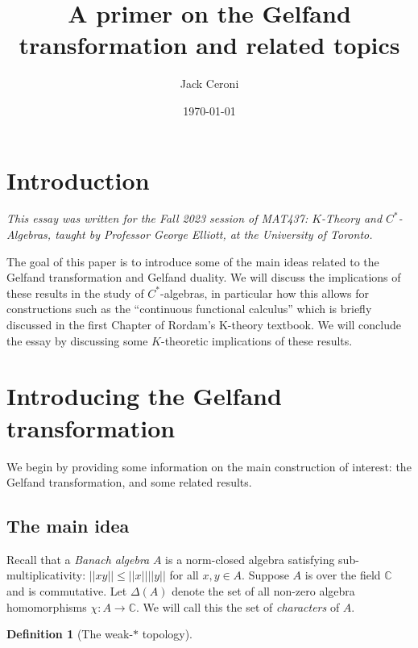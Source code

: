 \documentclass[aps,pra,showpacs,notitlepage,onecolumn,superscriptaddress,nofootinbib]{revtex4-1}
\theoremstyle{definition}
\newtheorem{definition}{Definition}[section]
\begin{document}
\title{A primer on the Gelfand transformation and related topics}
\author{Jack Ceroni}

\date{\today}

\maketitle

\section{Introduction}

\noindent \emph{This essay was written for the Fall 2023 session of MAT437: $K$-Theory and $C^{*}$-Algebras, taught by Professor George Elliott, at the University of Toronto.}
\newline

\noindent The goal of this paper is to introduce some of the main ideas related to the Gelfand transformation and Gelfand duality.
We will discuss the implications of these results in the study of $C^{*}$-algebras, in particular how this allows for constructions
such as the ``continuous functional calculus'' which is briefly discussed in the first Chapter of Rordam's K-theory textbook. We will conclude the essay by
discussing some $K$-theoretic implications of these results.

\section{Introducing the Gelfand transformation}

\noindent We begin by providing some information on the main construction of interest: the Gelfand transformation, and some related results.

\subsection{The main idea}

\noindent Recall that a \emph{Banach algebra} $A$ is a norm-closed algebra satisfying sub-multiplicativity: $||xy|| \leq ||x|| ||y||$ for all $x, y \in A$. Suppose $A$ is over the field $\mathbb{C}$
and is commutative. Let $\Delta(A)$ denote the set of all non-zero algebra homomorphisms $\chi : A \rightarrow \mathbb{C}$. We will call this the set of \emph{characters} of $A$.

\begin{definition}[The weak-$*$ topology]

  \end{definition}
\end{document}
